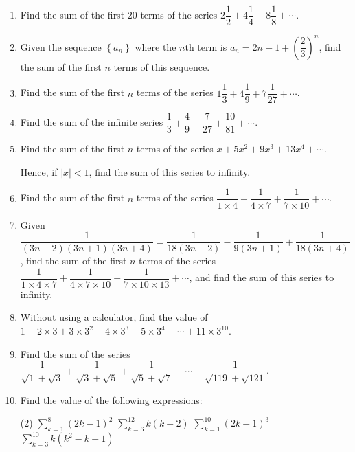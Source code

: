 \documentclass{report}
\begin{document}
        \begin{enumerate}
            \item Find the sum of the first $20$ terms of the series $2 \dfrac{1}{2}+4 \dfrac{1}{4}+8 \dfrac{1}{8}+\cdots$.

            \item Given the sequence $\left\{a_{n}\right\}$ where the $n$th term is $a_{n}=2 n-1+\left(\dfrac{2}{3}\right)^{n}$, find the sum of the first $n$ terms of this sequence.
            
            \item Find the sum of the first $n$ terms of the series $1 \dfrac{1}{3}+4 \dfrac{1}{9}+7 \dfrac{1}{27}+\cdots$.
            
            \item Find the sum of the infinite series $\dfrac{1}{3}+\dfrac{4}{9}+\dfrac{7}{27}+\dfrac{10}{81}+\cdots$.
            
            \item Find the sum of the first $n$ terms of the series $x+5 x^{2}+9 x^{3}+13 x^{4}+\cdots$. 
            
            Hence, if $|x|<1$, find the sum of this series to infinity.

            \item Find the sum of the first $n$ terms of the series $\dfrac{1}{1 \times 4}+\dfrac{1}{4 \times 7}+\dfrac{1}{7 \times 10}+\cdots$.
            
            \item Given $\dfrac{1}{(3 n-2)(3 n+1)(3 n+4)}=\dfrac{1}{18(3 n-2)}-\dfrac{1}{9(3 n+1)}+\dfrac{1}{18(3 n+4)}$, find the sum of the first $n$ terms of the series $\dfrac{1}{1 \times 4 \times 7}+\dfrac{1}{4 \times 7 \times 10}+\dfrac{1}{7 \times 10 \times 13}+\cdots$, and find the sum of this series to infinity.
            
            \item Without using a calculator, find the value of $1-2 \times 3+3 \times 3^{2}-4 \times 3^{3}+5 \times 3^{4}-\cdots+11 \times 3^{10}$.
            
            \item Find the sum of the series $\dfrac{1}{\sqrt{1}+\sqrt{3}}+\dfrac{1}{\sqrt{3}+\sqrt{5}}+\dfrac{1}{\sqrt{5}+\sqrt{7}}+\cdots+\dfrac{1}{\sqrt{119}+\sqrt{121}}$.
            
            \newpage
            \item Find the value of the following expressions:
            \begin{tasks}[label=(\alph*)](2)
                \task $\displaystyle\sum_{k=1}^{8}(2 k-1)^{2}$
                \task $\displaystyle\sum_{k=6}^{12} k(k+2)$
                \task $\displaystyle\sum_{k=1}^{10}(2 k-1)^{3}$
                \task $\displaystyle\sum_{k=3}^{10} k\left(k^{2}-k+1\right)$
            \end{tasks}


\end{enumerate}
\end{document}
